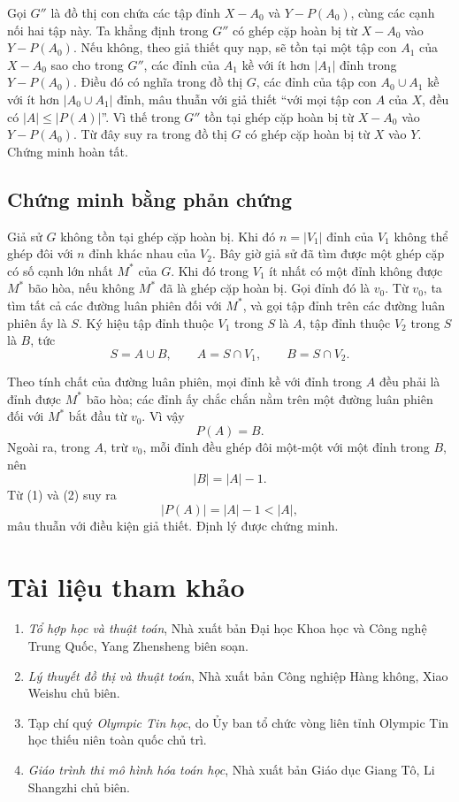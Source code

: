 \documentclass[11pt]{article}
\begin{document}
Gọi \(G''\) là đồ thị con chứa các tập đỉnh \(X-A_0\) và \(Y-P(A_0)\), cùng
các cạnh nối hai tập này. Ta khẳng định trong \(G''\) có ghép cặp hoàn bị từ
\(X-A_0\) vào \(Y-P(A_0)\). Nếu không, theo giả thiết quy nạp, sẽ tồn tại một
tập con \(A_1\) của \(X-A_0\) sao cho trong \(G''\), các đỉnh của \(A_1\) kề
với ít hơn \(|A_1|\) đỉnh trong \(Y-P(A_0)\). Điều đó có nghĩa trong đồ thị
\(G\), các đỉnh của tập con \(A_0\cup A_1\) kề với ít hơn
\(|A_0\cup A_1|\) đỉnh, mâu thuẫn với giả thiết ``với mọi tập con \(A\) của
\(X\), đều có \(|A|\le |P(A)|\)''. Vì thế trong \(G''\) tồn tại ghép cặp
hoàn bị từ \(X-A_0\) vào \(Y-P(A_0)\). Từ đây suy ra trong đồ thị \(G\) có
ghép cặp hoàn bị từ \(X\) vào \(Y\). Chứng minh hoàn tất.

\subsection{Chứng minh bằng phản chứng}

Giả sử \(G\) không tồn tại ghép cặp hoàn bị. Khi đó \(n=|V_1|\) đỉnh của
\(V_1\) không thể ghép đôi với \(n\) đỉnh khác nhau của \(V_2\). Bây giờ
giả sử đã tìm được một ghép cặp có số cạnh lớn nhất \(M^*\) của \(G\). Khi
đó trong \(V_1\) ít nhất có một đỉnh không được \(M^*\) bão hòa, nếu không
\(M^*\) đã là ghép cặp hoàn bị. Gọi đỉnh đó là \(v_0\). Từ \(v_0\), ta tìm
tất cả các đường luân phiên đối với \(M^*\), và gọi tập đỉnh trên các đường
luân phiên ấy là \(S\). Ký hiệu tập đỉnh thuộc \(V_1\) trong \(S\) là \(A\),
tập đỉnh thuộc \(V_2\) trong \(S\) là \(B\), tức
\[
  S=A\cup B,\qquad A=S\cap V_1,\qquad B=S\cap V_2.
\]

Theo tính chất của đường luân phiên, mọi đỉnh kề với đỉnh trong \(A\) đều
phải là đỉnh được \(M^*\) bão hòa; các đỉnh ấy chắc chắn nằm trên một đường
luân phiên đối với \(M^*\) bắt đầu từ \(v_0\). Vì vậy
\[
  P(A)=B. \tag{1}
\]
Ngoài ra, trong \(A\), trừ \(v_0\), mỗi đỉnh đều ghép đôi một-một với một
đỉnh trong \(B\), nên
\[
  |B|=|A|-1. \tag{2}
\]
Từ (1) và (2) suy ra
\[
  |P(A)|=|A|-1<|A|,
\]
mâu thuẫn với điều kiện giả thiết. Định lý được chứng minh.

\section{Tài liệu tham khảo}

\begin{enumerate}
  \item \textit{Tổ hợp học và thuật toán}, Nhà xuất bản Đại học Khoa học và
  Công nghệ Trung Quốc, Yang Zhensheng biên soạn.
  \item \textit{Lý thuyết đồ thị và thuật toán}, Nhà xuất bản Công nghiệp
  Hàng không, Xiao Weishu chủ biên.
  \item Tạp chí quý \textit{Olympic Tin học}, do Ủy ban tổ chức vòng liên
  tỉnh Olympic Tin học thiếu niên toàn quốc chủ trì.
  \item \textit{Giáo trình thi mô hình hóa toán học}, Nhà xuất bản Giáo dục
  Giang Tô, Li Shangzhi chủ biên.
\end{enumerate}
\end{document}

